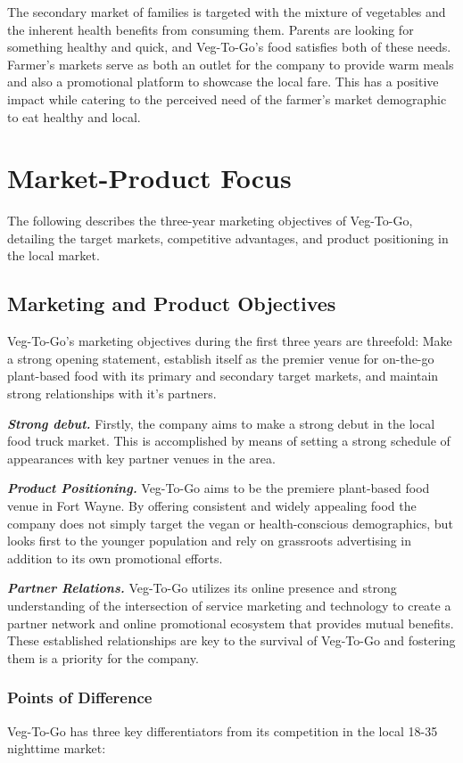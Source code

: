 \documentclass[12pt, letterpaper]{article}
\newcommand{\companyname}{Veg-To-Go}
\begin{document}
The secondary market of families is targeted with the mixture of vegetables and the inherent health benefits from consuming them.  Parents are looking for something healthy and quick, and \companyname{}'s food satisfies both of these needs. Farmer's markets serve as both an outlet for the company to provide warm meals and also a promotional platform to showcase the local fare. This has a positive impact while catering to the perceived need of the farmer's market demographic to eat healthy and local.

\newpage

\section{Market-Product Focus}
The following describes the three-year marketing objectives of \companyname{}, detailing the target markets, competitive advantages, and product positioning in the local market.
\subsection{Marketing and Product Objectives}
\companyname's{} marketing objectives during the first three years are threefold:  Make a strong opening statement, establish itself as the premier venue for on-the-go plant-based food with its primary and secondary target markets, and maintain strong relationships with it's partners.

\textbf{\emph{Strong debut.}} Firstly, the company aims to make a strong debut in the local food truck market.  This is accomplished by means of setting a strong schedule of appearances with key partner venues in the area.

\textbf{\emph{Product Positioning.}} \companyname{} aims to be the premiere plant-based food venue in Fort Wayne.  By offering consistent and widely appealing food the company does not simply target the vegan or health-conscious demographics, but looks first to the younger population and rely on grassroots advertising in addition to its own promotional efforts.

\textbf{\emph{Partner Relations.}} \companyname{} utilizes its online presence and strong understanding of the intersection of service marketing and technology to create a partner network and online promotional ecosystem that provides mutual benefits. These established relationships are key to the survival of \companyname{} and fostering them is a priority for the company.

\subsubsection{Points of Difference}
\companyname{} has three key differentiators from its competition in the local 18-35 nighttime market:
\end{document}
